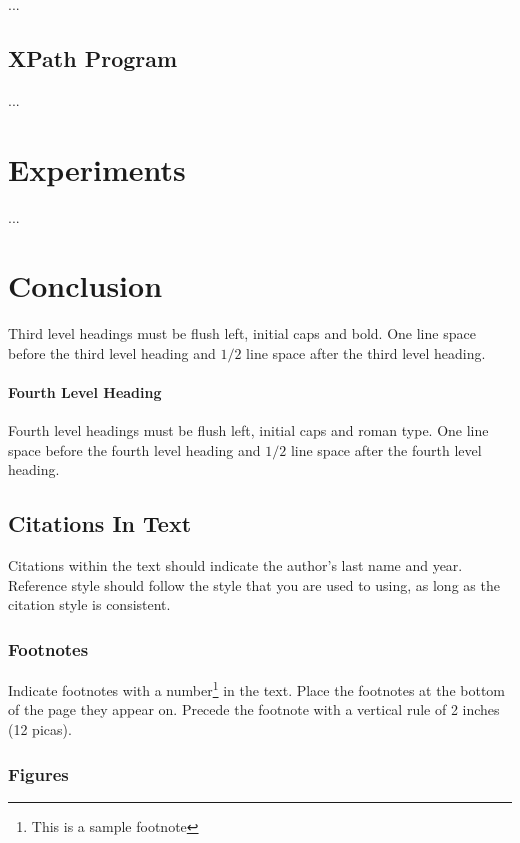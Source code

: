 \documentclass[a4paper]{article}
\begin{document}
...

\subsection{XPath Program }

...

\section{Experiments }

...

\section{Conclusion }

Third level headings must be flush left, initial caps and bold.
One line space before the third level heading and $1/2$ line
space after the third level heading.

\paragraph{Fourth Level Heading}

Fourth level headings must be flush left, initial caps and roman type.
One line space before the fourth level heading and $1/2$ line
space after the fourth level heading.

\subsection{Citations In Text}

Citations within the text should indicate the author's last name and
year\cite{Knuth-vol3}. Reference style\cite{Comer-btree}
should follow the style that you are used to using, as long as the
citation style is consistent.

\subsubsection{Footnotes}

Indicate footnotes with a number\footnote{This is a sample footnote} in
the text. Place the footnotes at the bottom of the page they appear on.
Precede the footnote with a vertical rule of 2 inches (12 picas).

\subsubsection{Figures}
\end{document}
